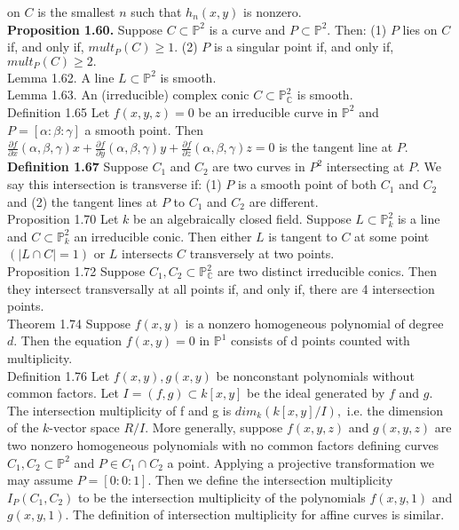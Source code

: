 \documentclass[8pt]{extarticle}
\begin{document}
on $C$ is the smallest $n$ such that $h_n(x,y)$ is nonzero.\\
\textbf{Proposition 1.60.} Suppose $C \subset \mathbb{P}^2$ is a curve and $P \subset \mathbb{P}^2.$ Then: (1) $P$ lies on $C$ if, and only if, $mult_P(C)\ge 1.$ (2) $P$ is a singular point if, and only if, $mult_P (C) \ge 2.$\\
Lemma 1.62. A line $L \subset \mathbb{P}^2$ is smooth.\\
Lemma 1.63. An (irreducible) complex conic $C\subset \mathbb{P}^2_\mathbb{C}$ is smooth.\\
Definition 1.65 Let $f(x,y,z) = 0$ be an irreducible curve in $\mathbb{P}^2$ and $P = [\alpha : \beta : \gamma]$ a smooth point. Then $\frac{\partial f}{\partial x}(\alpha,\beta,\gamma)x+\frac{\partial f}{\partial y}(\alpha,\beta,\gamma)y+\frac{\partial f}{\partial z}(\alpha,\beta,\gamma)z=0$ is the tangent line at $P.$\\
\textbf{Definition 1.67} Suppose $C_1$ and $C_2$ are two curves in $P^2$ intersecting at $P.$ We say this intersection is transverse if: (1) $P$ is a smooth point of both $C_1$ and $C_2$ and (2) the tangent lines at $P$ to $C_1$ and $C_2$ are different.\\
Proposition 1.70 Let $k$ be an algebraically closed field. Suppose $L \subset \mathbb{P}^2_k$ is a line and $C \subset \mathbb{P}^2_k$ an irreducible conic. Then either $L$ is tangent to $C$ at some point $(|L \cap C| = 1)$ or $L$ intersects $C$ transversely at two points.\\
Proposition 1.72 Suppose $C_1, C_2 \subset \mathbb{P}^2_\mathbb{C}$ are two distinct irreducible conics. Then they intersect transversally at all points if, and only if, there are 4 intersection points.\\
Theorem 1.74 Suppose $f(x,y)$ is a nonzero homogeneous polynomial of degree $d.$ Then the equation $f(x, y) = 0$ in $\mathbb{P}^1$ consists of d points counted with multiplicity.\\
Definition 1.76 Let $f(x,y),g(x,y)$ be nonconstant polynomials without common factors. Let $I =(f,g)\subset k[x, y]$ be the ideal generated by $f$ and $g.$ The intersection multiplicity of f and g is $dim_k(k[x, y]/I),$ i.e. the dimension of the $k$-vector space $R/I.$ More generally, suppose $f(x,y,z)$ and $g(x,y,z)$ are two nonzero homogeneous polynomials with no common factors defining curves $C_1, C_2 \subset \mathbb{P}^2$ and $P \in C_1 \cap C_2$ a point. Applying a projective transformation we may assume $P = [0 : 0 : 1].$ Then we define the intersection multiplicity $I_P (C_1, C_2)$ to be the intersection multiplicity of the polynomials $f(x,y,1)$ and $g(x,y,1).$ The definition of intersection multiplicity for affine curves is similar.\\
\end{document}
